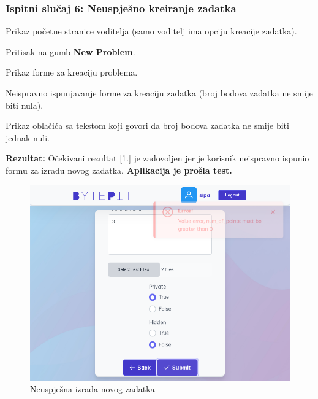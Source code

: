 			\subsubsection{Ispitni slučaj 6: Neuspješno kreiranje zadatka}
			
			
			\begin{packed_enum}
				
				\item  Prikaz početne stranice voditelja (samo voditelj ima opciju kreacije zadatka).
				\item  Pritisak na gumb \textbf{New Problem}.
				\item  Prikaz forme za kreaciju problema.
				\item  Neispravno ispunjavanje forme za kreaciju zadatka (broj bodova zadatka ne smije biti nula).
				
			\end{packed_enum}
			
			\begin{packed_enum}
				
				\item  Prikaz oblačića sa tekstom koji govori da broj bodova zadatka ne smije biti jednak nuli.
				
			\end{packed_enum}
			
			\noindent \textbf{Rezultat:} Očekivani rezultat [1.] je zadovoljen jer je korisnik neispravno ispunio formu za izradu novog zadatka. \textbf{Aplikacija je prošla test.}
			
			\begin{figure}[H]
				\includegraphics[scale=0.38]{slike/create_problem_test_wrong.PNG}
				\centering
				\caption{Neuspješna izrada novog zadatka}
				\label{fig:failed_new_problem}
			\end{figure}
			
